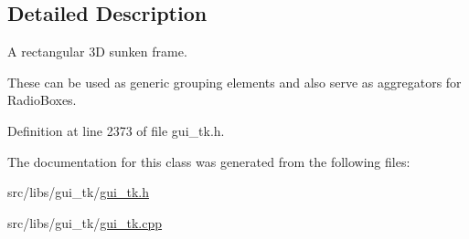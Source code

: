 \subsection{Detailed Description}
A rectangular 3\-D sunken frame. 

These can be used as generic grouping elements and also serve as aggregators for Radio\-Boxes. 

Definition at line 2373 of file gui\-\_\-tk.\-h.



The documentation for this class was generated from the following files\-:\begin{DoxyCompactItemize}
\item 
src/libs/gui\-\_\-tk/\hyperlink{gui__tk_8h}{gui\-\_\-tk.\-h}\item 
src/libs/gui\-\_\-tk/\hyperlink{gui__tk_8cpp}{gui\-\_\-tk.\-cpp}\end{DoxyCompactItemize}
